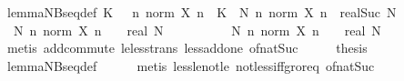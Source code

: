 \begin{isabellebody}
\endisatagproof
{\isafoldproof}%
%
\isadelimproof
\isanewline
%
\endisadelimproof
\isanewline
{}\isamarkupfalse%
\ lemma{\isacharunderscore}{\kern0pt}NBseq{\isacharunderscore}{\kern0pt}def{}{\isacharcolon}{\kern0pt}\ {\isachardoublequoteopen}{\isacharparenleft}{\kern0pt}{\isasymexists}K\ {\isachargreater}{\kern0pt}\ {}{\isachardot}{\kern0pt}\ {\isasymforall}n{\isachardot}{\kern0pt}\ norm\ {\isacharparenleft}{\kern0pt}X\ n{\isacharparenright}{\kern0pt}\ {\isasymle}\ K{\isacharparenright}{\kern0pt}\ {\isacharequal}{\kern0pt}\ {\isacharparenleft}{\kern0pt}{\isasymexists}N{\isachardot}{\kern0pt}\ {\isasymforall}n{\isachardot}{\kern0pt}\ norm\ {\isacharparenleft}{\kern0pt}X\ n{\isacharparenright}{\kern0pt}\ {\isacharless}{\kern0pt}\ real{\isacharparenleft}{\kern0pt}Suc\ N{\isacharparenright}{\kern0pt}{\isacharparenright}{\kern0pt}{\isachardoublequoteclose}\isanewline
%
\isadelimproof
%
\endisadelimproof
%
\isatagproof
{}\isamarkupfalse%
\ {\isacharminus}{\kern0pt}\isanewline
\ \ \isamarkupfalse%
\ {\isacharasterisk}{\kern0pt}{\isacharcolon}{\kern0pt}\ {\isachardoublequoteopen}{\isasymAnd}N{\isachardot}{\kern0pt}\ {\isasymforall}n{\isachardot}{\kern0pt}\ norm\ {\isacharparenleft}{\kern0pt}X\ n{\isacharparenright}{\kern0pt}\ {\isasymle}\ {}\ {\isacharplus}{\kern0pt}\ real\ N\ {\isasymLongrightarrow}\isanewline
\ \ \ \ \ \ \ \ \ {\isasymexists}N{\isachardot}{\kern0pt}\ {\isasymforall}n{\isachardot}{\kern0pt}\ norm\ {\isacharparenleft}{\kern0pt}X\ n{\isacharparenright}{\kern0pt}\ {\isacharless}{\kern0pt}\ {}\ {\isacharplus}{\kern0pt}\ real\ N{\isachardoublequoteclose}\isanewline
\ \ \ \ \isamarkupfalse%
\ {\isacharparenleft}{\kern0pt}metis\ add{\isachardot}{\kern0pt}commute\ le{\isacharunderscore}{\kern0pt}less{\isacharunderscore}{\kern0pt}trans\ less{\isacharunderscore}{\kern0pt}add{\isacharunderscore}{\kern0pt}one\ of{\isacharunderscore}{\kern0pt}nat{\isacharunderscore}{\kern0pt}Suc{\isacharparenright}{\kern0pt}\isanewline
\ \ \isamarkupfalse%
\ \isamarkupfalse%
\ {\isacharquery}{\kern0pt}thesis\isanewline
\ \ \ \ \isamarkupfalse%
\ lemma{\isacharunderscore}{\kern0pt}NBseq{\isacharunderscore}{\kern0pt}def\isanewline
\ \ \ \ \isamarkupfalse%
\ {\isacharparenleft}{\kern0pt}metis\ less{\isacharunderscore}{\kern0pt}le{\isacharunderscore}{\kern0pt}not{\isacharunderscore}{\kern0pt}le\ not{\isacharunderscore}{\kern0pt}less{\isacharunderscore}{\kern0pt}iff{\isacharunderscore}{\kern0pt}gr{\isacharunderscore}{\kern0pt}or{\isacharunderscore}{\kern0pt}eq\ of{\isacharunderscore}{\kern0pt}nat{\isacharunderscore}{\kern0pt}Suc{\isacharparenright}{\kern0pt}\isanewline

\end{isabellebody}
